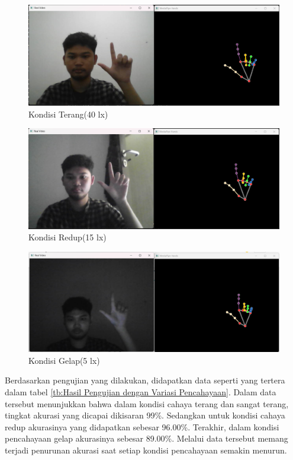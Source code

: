 \begin{figure}[!htb]
  \centering
  \includegraphics[scale=0.34]{gambar/pengujian-cahaya/kondisi_40lux.png}
  \caption{Kondisi Terang(40 lx)}
  \label{fig:kondisi_40lux} 
\end{figure}

\begin{figure}[!htb]
  \centering
  \includegraphics[scale=0.34]{gambar/pengujian-cahaya/kondisi_15lux.png}
  \caption{Kondisi Redup(15 lx)}
  \label{fig:kondisi_15lux} 
\end{figure}

\begin{figure}[!htb]
  \centering
  \includegraphics[scale=0.34]{gambar/pengujian-cahaya/kondisi_5lux.png}
  \caption{Kondisi Gelap(5 lx)}
  \label{fig:kondisi_5lux} 
\end{figure}

Berdasarkan pengujian yang dilakukan, didapatkan data seperti yang tertera dalam tabel \ref{tb:Hasil Pengujian dengan Variasi Pencahayaan}. Dalam data tersebut menunjukkan bahwa dalam kondisi cahaya terang dan sangat terang, tingkat akurasi yang dicapai dikisaran 99\%. Sedangkan untuk kondisi cahaya redup akurasinya yang didapatkan sebesar 96.00\%. Terakhir, dalam kondisi pencahayaan gelap akurasinya sebesar 89.00\%. Melalui data tersebut memang terjadi penurunan akurasi saat setiap kondisi pencahayaan semakin menurun. 


